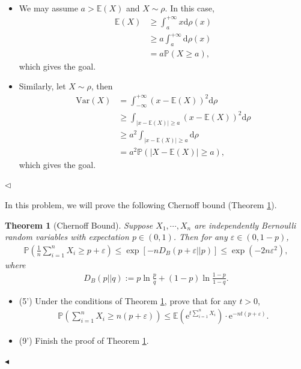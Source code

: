 ﻿\documentclass[11pt]{article}
\newtheorem{theorem}{Theorem}
\newenvironment{problem}[2][Problem]{\begin{trivlist}
\item[\hskip \labelsep {\bfseries #1}\hskip \labelsep {\bfseries #2.}]}{\hfill$\blacktriangleleft$\end{trivlist}}
\newenvironment{answer}[1][Answer]{\begin{trivlist}
\item[\hskip \labelsep {\bfseries #1.}\hskip \labelsep]}{\hfill$\lhd$\end{trivlist}}
\begin{document}
\begin{answer} ~
\begin{itemize}
    \item [(1)] We may assume $a>\mathbb{E}(X)$ and $X\sim\rho$. In this case,
        $$
            \begin{aligned}
                \mathbb{E}(X) &\ge \int_{a}^{+\infty} x\mathrm{d}\rho(x) \\
                &\ge a \int_a^{+\infty} \mathrm{d}\rho(x)\\
                &= a\mathbb{P}(X\ge a),
            \end{aligned}
        $$
        which gives the goal.
    \item [(2)] Similarly, let $X\sim\rho$, then
        $$
            \begin{aligned}
                \mathrm{Var}(X) &= \int_{-\infty}^{+\infty}(x-\mathbb{E}(X))^2\mathrm{d}\rho\\
                &\ge \int_{|x-\mathbb{E}(X)|\ge a}(x-\mathbb{E}(X))^2\mathrm{d}\rho\\
                &\ge a^2\int_{|x-\mathbb{E}(X)|\ge a}\mathrm{d}\rho\\
                &= a^2\mathbb{P}(|X-\mathbb{E}(X)|\ge a),
            \end{aligned}
        $$
        which gives the goal.
\end{itemize}
\end{answer}



\begin{problem}{4 (14')}
In this problem, we will prove the following Chernoff bound (Theorem \ref*{thm:chernoff}).
\begin{theorem}[Chernoff Bound]
\label{thm:chernoff}
    Suppose $X_1,\cdots,X_n$ are independently Bernoulli random variables with expectation $p\in(0,1)$. Then for any $\varepsilon\in(0,1-p)$,
    \begin{align*}
        \mathbb{P}\left(\frac{1}{n}\sum_{i=1}^n X_i\geq p+\varepsilon\right)\leq \exp\left[-nD_B(p+\varepsilon||p)\right] \leq \exp(-2n\varepsilon^2),
    \end{align*} 
where 
\begin{align*}
    D_B(p||q):=p\ln\frac{p}{q}+(1-p)\ln\frac{1-p}{1-q}.
\end{align*}
\end{theorem}
\begin{itemize}
    \item [(1)] (5') Under the conditions of Theorem \ref*{thm:chernoff}, prove that for any $t>0$,
    \begin{align*}
        \mathbb{P}\left(\sum_{i=1}^n X_i\geq n(p+\varepsilon)\right)\leq\mathbb{E}\left(\mathrm{e}^{t\sum_{i=1}^n X_i}\right)\cdot\mathrm{e}^{-nt(p+\varepsilon)}.
    \end{align*}
    \item [(2)] (9') Finish the proof of Theorem \ref*{thm:chernoff}.
\end{itemize}
\end{problem}
\end{document}
